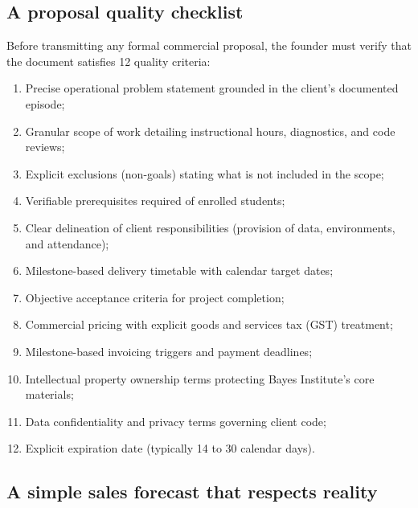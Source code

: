 \subsection{A proposal quality checklist}

Before transmitting any formal commercial proposal, the founder must verify that the document satisfies 12 quality criteria:
\begin{enumerate}
\item Precise operational problem statement grounded in the client's documented episode;
\item Granular scope of work detailing instructional hours, diagnostics, and code reviews;
\item Explicit exclusions (non-goals) stating what is not included in the scope;
\item Verifiable prerequisites required of enrolled students;
\item Clear delineation of client responsibilities (provision of data, environments, and attendance);
\item Milestone-based delivery timetable with calendar target dates;
\item Objective acceptance criteria for project completion;
\item Commercial pricing with explicit goods and services tax (GST) treatment;
\item Milestone-based invoicing triggers and payment deadlines;
\item Intellectual property ownership terms protecting Bayes Institute's core materials;
\item Data confidentiality and privacy terms governing client code;
\item Explicit expiration date (typically 14 to 30 calendar days).
\end{enumerate}

\subsection{A simple sales forecast that respects reality}

